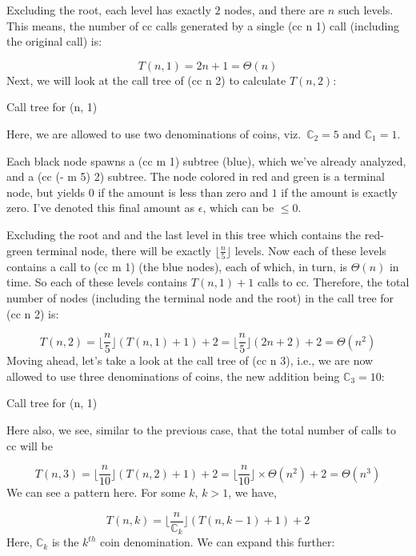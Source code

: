 \documentclass[
]{article}
\begin{document}
Excluding the root, each level has exactly \(2\) nodes, and there are
\(n\) such levels. This means, the number of cc calls generated by a
single (cc n 1) call (including the original call) is:

\[ T\left(n,1\right) = 2n + 1 = \Theta \left(n\right) \] Next, we will
look at the call tree of (cc n 2) to calculate \(T\left(n,2\right)\):

Call tree for (n, 1)

Here, we are allowed to use two denominations of coins,
viz.~\(\mathbb{C}_{2} = 5\) and \(\mathbb{C}_{1} = 1\).

Each black node spawns a (cc m 1) subtree (blue), which we've already
analyzed, and a (cc (- m 5) 2) subtree. The node colored in red and
green is a terminal node, but yields \(0\) if the amount is less than
zero and \(1\) if the amount is exactly zero. I've denoted this final
amount as \(\epsilon\), which can be \(\le0\).

Excluding the root and and the last level in this tree which contains
the red-green terminal node, there will be exactly
\(\lfloor {\frac {n} {5} } \rfloor\) levels. Now each of these levels
contains a call to (cc m 1) (the blue nodes), each of which, in turn, is
\(\Theta\left(n\right)\) in time. So each of these levels contains
\(T\left(n,1\right) + 1\) calls to cc. Therefore, the total number of
nodes (including the terminal node and the root) in the call tree for
(cc n 2) is:

\[ T\left(n,2\right) = \lfloor {\frac {n} {5} } \rfloor \left( T\left(n,1\right) + 1\right) + 2 = \lfloor {\frac {n} {5} } \rfloor \left( 2n + 2 \right) + 2 = \Theta\left(n^2\right) \]
Moving ahead, let's take a look at the call tree of (cc n 3), i.e., we
are now allowed to use three denominations of coins, the new addition
being \(\mathbb{C}_{3} = 10\):

Call tree for (n, 1)

Here also, we see, similar to the previous case, that the total number
of calls to cc will be

\[ T\left(n,3\right) = \lfloor {\frac {n} {10} } \rfloor \left( T\left(n,2\right) + 1 \right) + 2 = \lfloor {\frac {n} {10} } \rfloor \times \Theta\left(n^2\right) + 2 = \Theta\left(n^3\right) \]
We can see a pattern here. For some \(k\), \(k \gt 1\), we have,

\[ T\left(n,k\right) = \lfloor {\frac {n} { \mathbb{C}_{k} } } \rfloor \left( T\left(n, k-1\right) + 1 \right) + 2 \]
Here, \(\mathbb{C}_{k}\) is the \(k^{th}\) coin denomination. We can
expand this further:
\end{document}

